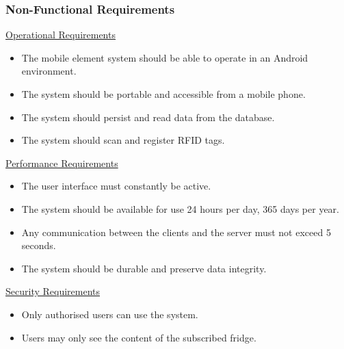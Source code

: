 \documentclass[a4paper, 11pt]{article}
\begin{document}
\subsubsection{Non-Functional Requirements}
\underline{Operational Requirements}
\begin{itemize}
  \item The mobile element system should be able to operate in an Android environment. 
  \item The system should be portable and accessible from a mobile phone.
  \item The system should persist and read data from the database. 
  \item The system should scan and register RFID tags.
\end{itemize}
\underline{Performance Requirements}
\begin{itemize}
  \item The user interface must constantly be active.
  \item The system should be available for use 24 hours per day, 365 days per year.
  \item Any communication between the clients and the server must not exceed 5 seconds.
  \item The system should be durable and preserve data integrity.
\end{itemize}
\underline{Security Requirements}
\begin{itemize}
  \item Only authorised users can use the system.
  \item Users may only see the content of the subscribed fridge.
\end{itemize}

\vspace{\baselineskip}
\end{document}
